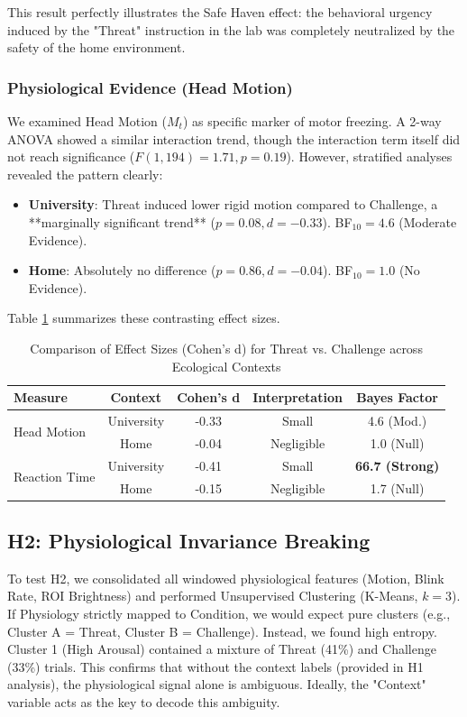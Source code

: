 \documentclass[journal]{IEEEtran}
\begin{document}
This result perfectly illustrates the Safe Haven effect: the behavioral urgency induced by the "Threat" instruction in the lab was completely neutralized by the safety of the home environment.

\subsubsection{Physiological Evidence (Head Motion)}
We examined Head Motion ($M_t$) as specific marker of motor freezing. A 2-way ANOVA showed a similar interaction trend, though the interaction term itself did not reach significance ($F(1,194)=1.71, p=0.19$). However, stratified analyses revealed the pattern clearly:

\begin{itemize}
    \item \textbf{University}: Threat induced lower rigid motion compared to Challenge, a **marginally significant trend** ($p = 0.08, d = -0.33$). BF$_{10} = 4.6$ (Moderate Evidence).
    \item \textbf{Home}: Absolutely no difference ($p = 0.86, d = -0.04$). BF$_{10} = 1.0$ (No Evidence).
\end{itemize}

Table \ref{tab:effect_sizes} summarizes these contrasting effect sizes.

\begin{table}[h]
\centering
\caption{Comparison of Effect Sizes (Cohen's d) for Threat vs. Challenge across Ecological Contexts}
\label{tab:effect_sizes}
\begin{tabular}{lcccc}
\toprule
\textbf{Measure} & \textbf{Context} & \textbf{Cohen's d} & \textbf{Interpretation} & \textbf{Bayes Factor} \\
\midrule
\multirow{2}{*}{Head Motion} & University & -0.33 & Small & 4.6 (Mod.) \\
                             & Home & -0.04 & Negligible & 1.0 (Null) \\
\midrule
\multirow{2}{*}{Reaction Time} & University & -0.41 & Small & \textbf{66.7 (Strong)} \\
                              & Home & -0.15 & Negligible & 1.7 (Null) \\
\bottomrule
\end{tabular}
\end{table}

\subsection{H2: Physiological Invariance Breaking}
To test H2, we consolidated all windowed physiological features (Motion, Blink Rate, ROI Brightness) and performed Unsupervised Clustering (K-Means, $k=3$). If Physiology strictly mapped to Condition, we would expect pure clusters (e.g., Cluster A = Threat, Cluster B = Challenge).
Instead, we found high entropy. Cluster 1 (High Arousal) contained a mixture of Threat (41\%) and Challenge (33\%) trials. This confirms that without the context labels (provided in H1 analysis), the physiological signal alone is ambiguous. Ideally, the "Context" variable acts as the key to decode this ambiguity.
\end{document}
